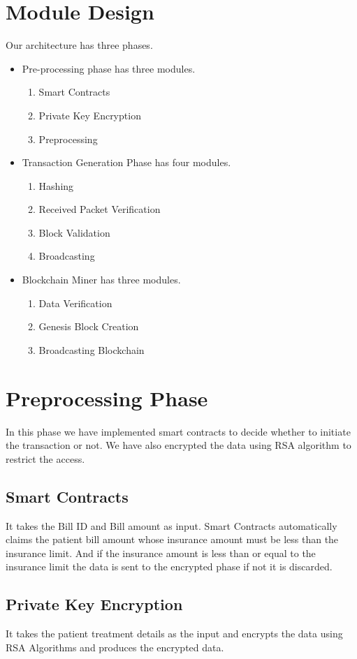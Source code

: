 \section{Module Design}
\lipsum[]
Our architecture has three phases.
\begin{itemize}
    \item Pre-processing phase has three modules.
    \begin{enumerate}
        \item Smart Contracts
\item Private Key Encryption
\item Preprocessing
    \end{enumerate}
    \item Transaction Generation Phase has four modules.
    \begin{enumerate}
        \item Hashing
\item Received Packet Verification
\item Block Validation
\item Broadcasting
    \end{enumerate}
    \item Blockchain Miner has three modules.
    \begin{enumerate}
        \item Data Verification
\item Genesis Block Creation
\item Broadcasting Blockchain
    \end{enumerate}
    \end{itemize}
\section{Preprocessing Phase}
In this phase we have implemented smart contracts to decide whether to initiate the transaction or not. We have also encrypted the data using RSA algorithm to restrict the access.
\subsection{Smart Contracts}
It takes the Bill ID and Bill amount as input. Smart Contracts automatically claims the patient bill amount whose insurance amount must be less than the insurance limit. And if the insurance amount is less than or equal to the insurance limit the data is sent to the encrypted phase if not it is discarded.
\subsection{Private Key Encryption}
It takes the patient treatment details as the input and encrypts the data using RSA Algorithms and produces the encrypted data.
